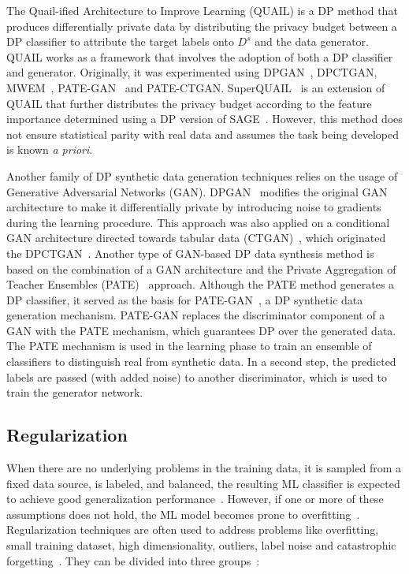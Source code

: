 \documentclass[parskip=full]{scrartcl}
\begin{document}
The Quail-ified Architecture to Improve Learning (QUAIL) is a DP method that
produces differentially private data by distributing the privacy budget
between a DP classifier to attribute the target labels onto $D^s$ and the data
generator. QUAIL works as a framework that involves the adoption of both a DP
classifier and generator. Originally, it was experimented using
DPGAN~\cite{xie2018differentially}, DPCTGAN, MWEM~\cite{hardt2012simple},
PATE-GAN~\cite{jordon2018pate} and PATE-CTGAN\@.
SuperQUAIL~\cite{rosenblatt2022spending} is an extension of QUAIL that further
distributes the privacy budget according to the feature importance determined
using a DP version of SAGE~\cite{covert2020understanding}. However, this
method does not ensure statistical parity with real data and assumes the task
being developed is known \textit{a priori}.

Another family of DP synthetic data generation techniques relies on the usage
of Generative Adversarial Networks (GAN). DPGAN~\cite{xie2018differentially}
modifies the original GAN architecture to make it differentially private by
introducing noise to gradients during the learning procedure. This approach
was also applied on a conditional GAN architecture directed towards tabular
data (CTGAN)~\cite{xu2019modeling}, which originated the
DPCTGAN~\cite{rosenblatt2020differentially}. Another type of GAN-based DP data
synthesis method is based on the combination of a GAN architecture and the
Private Aggregation of Teacher Ensembles (PATE)~\cite{papernot2017semi}
approach. Although the PATE method generates a DP classifier, it served as the
basis for PATE-GAN~\cite{jordon2018pate}, a DP synthetic data generation
mechanism. PATE-GAN replaces the discriminator component of a GAN with the
PATE mechanism, which guarantees DP over the generated data. The PATE
mechanism is used in the learning phase to train an ensemble of classifiers to
distinguish real from synthetic data. In a second step, the predicted labels
are passed (with added noise) to another discriminator, which is used to train
the generator network.

\subsection{Regularization}\label{sec:regularization}

When there are no underlying problems in the training data, it is sampled from
a fixed data source, is labeled, and balanced, the resulting ML classifier is
expected to achieve good generalization performance~\cite{benning2018modern}.
However, if one or more of these assumptions does not hold, the ML model
becomes prone to overfitting~\cite{Bartlett2021}. Regularization techniques
are often used to address problems like overfitting, small training dataset,
high dimensionality, outliers, label noise and catastrophic
forgetting~\cite{Halevy2009, Domingos2012, Salman2019, Xie2021}. They can be
divided into three groups~\cite{santos2022avoiding}:
\end{document}
